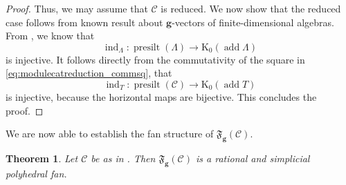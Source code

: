 \documentclass[10pt,twoside, a4paper,reqno]{amsart}
\DeclareMathOperator{\presilt}{presilt}
\DeclareMathOperator{\add}{add}
\DeclareMathOperator{\ind}{ind}
\newcommand{\partfan}[1]{\mathfrak{F}_{\bfg}(#1)}
\newcommand{\calC}{\mathcal{C}}
\newcommand{\K}{\mathrm{K}}
\newcommand{\bfg}{\mathbf{g}}
\newtheorem{theorem}{Theorem}[section]
\theoremstyle{definition}
\begin{document}
\begin{proof}
	Thus, we may assume that $\calC$ is reduced. We now show that the reduced case follows from known result about $\bfg$-vectors of finite-dimensional algebras. From \cite[Cor. 6.7(a)]{DIJ2019}, we know that 
	\[ \ind_{\Lambda}: \presilt(\Lambda) \to \K_0(\add \Lambda) \]
	is injective. It follows directly from the commutativity of the square in \eqref{eq:modulecatreduction_commsq}, that
	\[ \ind_T: \presilt(\calC) \to \K_0(\add T) \]
	is injective, because the horizontal maps are bijective. This concludes the proof.
	\end{proof}
	
We are now able to establish the fan structure of $\partfan{\calC}$. 

\begin{theorem}\label{thm:IsFan}
    Let $\calC$ be as in . Then $\partfan{\calC}$ is a rational and simplicial polyhedral fan.
\end{theorem}
\end{document}
